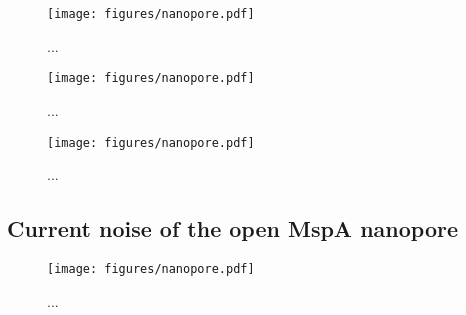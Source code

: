 \begin{figure}[h]
\begin{centering}
\texttt{[image: figures/nanopore.pdf]}
\caption[100mer ssDNA in the MspA nanopore]{...}
\label{fig:mspa_100mer}
\end{centering}
\end{figure}

\begin{figure}[h]
\begin{centering}
\texttt{[image: figures/nanopore.pdf]}
\caption[5.3kb ssDNA in the MspA nanopore]{...}
\label{fig:mspa_5kb}
\end{centering}
\end{figure}

\begin{figure}[h]
\begin{centering}
\texttt{[image: figures/nanopore.pdf]}
\caption[The ATP molecule in the MspA nanopore]{...}
\label{fig:mspa_atp}
\end{centering}
\end{figure}

\subsection{Current noise of the open MspA nanopore}

\begin{figure}[h]
\begin{centering}
\texttt{[image: figures/nanopore.pdf]}
\caption[Current noise in the MspA nanopore]{...}
\label{fig:mspa_open_noise}
\end{centering}
\end{figure}